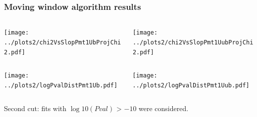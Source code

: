 \documentclass[aspectratio=169]{beamer}
\begin{document}
\begin{frame}
  \frametitle{Moving window algorithm results}
  \vspace{0.5cm}
  \begin{columns}
    \begin{column}{0.5\textwidth}
      \texttt{[image: ../plots2/chi2VsSlopPmt1UbProjChi2.pdf]}
    \end{column}
    \begin{column}{0.5\textwidth}
      \texttt{[image: ../plots2/chi2VsSlopPmt1UubProjChi2.pdf]}
    \end{column}
  \end{columns}
  \begin{columns}
    \begin{column}{0.5\textwidth}
      \texttt{[image: ../plots2/logPvalDistPmt1Ub.pdf]}
    \end{column}
    \begin{column}{0.5\textwidth}
      \texttt{[image: ../plots2/logPvalDistPmt1Uub.pdf]}
    \end{column}
  \end{columns}
  {\footnotesize 
    Second cut: fits with $\log10(Pval)$ > $-10$ were considered.
  }
\end{frame}
\end{document}
